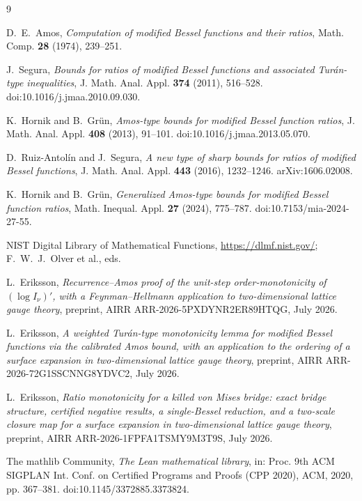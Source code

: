 \documentclass[11pt]{article}
\begin{document}
\begin{thebibliography}{9}

 D.~E.~Amos,
\emph{Computation of modified Bessel functions and their ratios},
Math. Comp. \textbf{28} (1974), 239--251.

 J.~Segura,
\emph{Bounds for ratios of modified Bessel functions and associated
Tur\'an-type inequalities},
J. Math. Anal. Appl. \textbf{374} (2011), 516--528.
doi:10.1016/j.jmaa.2010.09.030.

 K.~Hornik and B.~Gr\"un,
\emph{Amos-type bounds for modified Bessel function ratios},
J. Math. Anal. Appl. \textbf{408} (2013), 91--101.
doi:10.1016/j.jmaa.2013.05.070.

 D.~Ruiz-Antol\'in and J.~Segura,
\emph{A new type of sharp bounds for ratios of modified Bessel
functions}, J. Math. Anal. Appl. \textbf{443} (2016), 1232--1246.
arXiv:1606.02008.

 K.~Hornik and B.~Gr\"un,
\emph{Generalized Amos-type bounds for modified Bessel function
ratios}, Math. Inequal. Appl. \textbf{27} (2024), 775--787.
doi:10.7153/mia-2024-27-55.

 NIST Digital Library of Mathematical Functions,
\url{https://dlmf.nist.gov/}; F.~W.~J.~Olver et al., eds.

 L.~Eriksson,
\emph{Recurrence--Amos proof of the unit-step order-monotonicity of
$(\log I_\nu)'$, with a Feynman--Hellmann application to
two-dimensional lattice gauge theory}, preprint,
AIRR ARR-2026-5PXDYNR2ER89HTQG, July 2026.

 L.~Eriksson,
\emph{A weighted Tur\'an-type monotonicity lemma for modified Bessel
functions via the calibrated Amos bound, with an application to the
ordering of a surface expansion in two-dimensional lattice gauge
theory}, preprint, AIRR ARR-2026-72G1SSCNNG8YDVC2, July 2026.

 L.~Eriksson,
\emph{Ratio monotonicity for a killed von Mises bridge: exact bridge
structure, certified negative results, a single-Bessel reduction, and
a two-scale closure map for a surface expansion in two-dimensional
lattice gauge theory}, preprint, AIRR ARR-2026-1FPFA1TSMY9M3T9S, July 2026.

 The mathlib Community,
\emph{The Lean mathematical library}, in: Proc. 9th ACM SIGPLAN
Int. Conf. on Certified Programs and Proofs (CPP 2020), ACM, 2020,
pp. 367--381. doi:10.1145/3372885.3373824.

\end{thebibliography}
\end{document}

